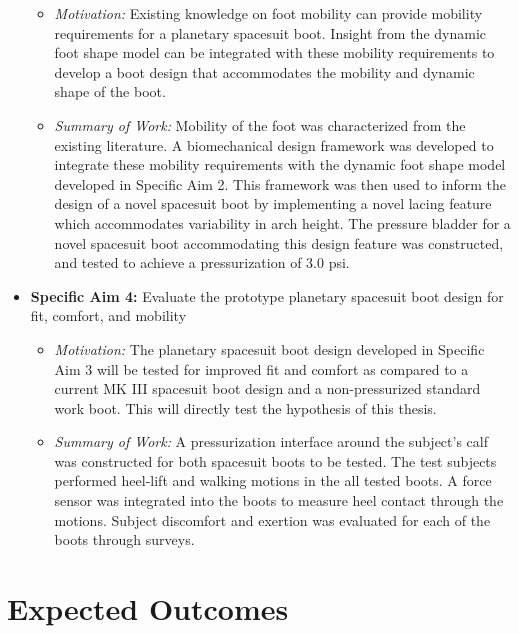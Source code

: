 \documentclass[defaultstyle,11pt]{thesis}
\providecommand{\tightlist}{%
  \setlength{\itemsep}{0pt}\setlength{\parskip}{0pt}}
\begin{document}
\begin{itemize}
  \begin{itemize}
  \tightlist
  \item
    \emph{Motivation:} Existing knowledge on foot mobility can provide mobility requirements for a planetary spacesuit boot.
    Insight from the dynamic foot shape model can be integrated with these mobility requirements to develop a boot design that accommodates the mobility and dynamic shape of the boot.
  \item
    \emph{Summary of Work:} Mobility of the foot was characterized from the existing literature.
    A biomechanical design framework was developed to integrate these mobility requirements with the dynamic foot shape model developed in Specific Aim 2.
    This framework was then used to inform the design of a novel spacesuit boot by implementing a novel lacing feature which accommodates variability in arch height.
    The pressure bladder for a novel spacesuit boot accommodating this design feature was constructed, and tested to achieve a pressurization of 3.0 psi.
  \end{itemize}
\item
  \textbf{Specific Aim 4:} Evaluate the prototype planetary spacesuit boot design for fit, comfort, and mobility

  \begin{itemize}
  \tightlist
  \item
    \emph{Motivation:} The planetary spacesuit boot design developed in Specific Aim 3 will be tested for improved fit and comfort as compared to a current MK III spacesuit boot design and a non-pressurized standard work boot.
    This will directly test the hypothesis of this thesis.
  \item
    \emph{Summary of Work:} A pressurization interface around the subject's calf was constructed for both spacesuit boots to be tested.
    The test subjects performed heel-lift and walking motions in the all tested boots.
    A force sensor was integrated into the boots to measure heel contact through the motions.
    Subject discomfort and exertion was evaluated for each of the boots through surveys.
  \end{itemize}
\end{itemize}

\hypertarget{expected-outcomes}{%
\section{Expected Outcomes}\label{expected-outcomes}}
\end{document}

